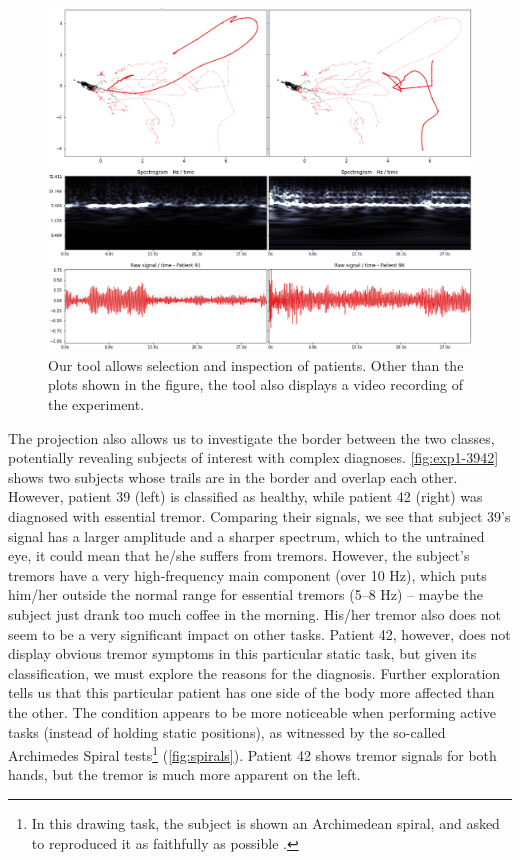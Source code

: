 \begin{figure}[ht]
\centering
\includegraphics[width=\linewidth]{figures/nemo/exp1-9196.png}
\caption{Our tool allows selection and inspection of patients. Other than the plots shown in the figure, the tool also displays a video recording of the experiment.}
\label{fig:exp1-9196}
\end{figure}

The projection also allows us to investigate the border between the two classes, potentially revealing subjects of interest with complex diagnoses.
\cref{fig:exp1-3942} shows two subjects whose trails are in the border and overlap each other. However, patient 39 (left) is classified as healthy, while patient 42 (right) was diagnosed with essential tremor. Comparing their signals, we see that subject 39's signal has a larger amplitude and a sharper spectrum, which to the untrained eye, it could mean that he/she suffers from tremors. However, the subject's tremors have a very high-frequency main component (over 10 Hz), which puts him/her outside the normal range for essential tremors (5--8 Hz) -- maybe the subject just drank too much coffee in the morning. His/her tremor also does not seem to be a very significant impact on other tasks. Patient 42, however, does not display obvious tremor symptoms in this particular static task, but given its classification, we must explore the reasons for the diagnosis.
Further exploration tells us that this particular patient has one side of the body more affected than the other. The condition appears to be more noticeable when performing active tasks (instead of holding static positions), as witnessed by the so-called Archimedes Spiral tests\footnote{In this drawing task, the subject is shown an Archimedean spiral, and asked to reproduced it as faithfully as possible \citep{bain}.} (\cref{fig:spirals}). Patient 42 shows tremor signals for both hands, but the tremor is much more apparent on the left.

